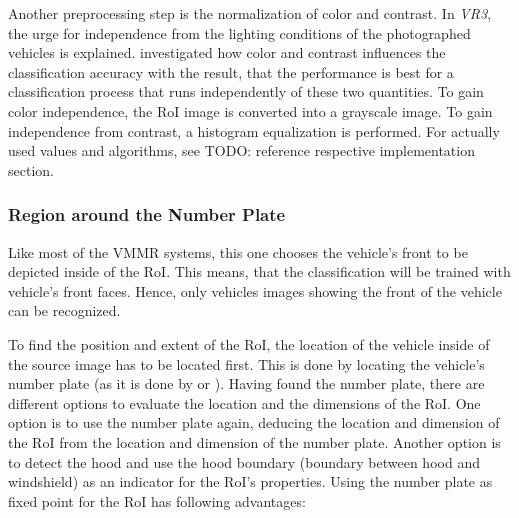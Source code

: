 Another preprocessing step is the normalization of color and contrast. In \emph{VR3}, the urge for independence from the lighting conditions of the photographed vehicles is explained. \citeauthor{petrovic2004analysis} investigated how color and contrast influences the classification accuracy with the result, that the performance is best for a classification process that runs independently of these two quantities. To gain color independence, the RoI image is converted into a grayscale image. To gain independence from contrast, a histogram equalization is performed. For actually used values and algorithms, see TODO: reference respective implementation section.

\subsubsection{Region around the Number Plate}\label{sec:regionAroundNumberPlate}
Like most of the VMMR systems, this one chooses the vehicle's front to be depicted inside of the RoI. This means, that the classification will be trained with vehicle's front faces. Hence, only vehicles images showing the front of the vehicle can be recognized.

To find the position and extent of the RoI, the location of the vehicle inside of the source image has to be located first. This is done by locating the vehicle's number plate (as it is done by \citep{petrovic2004analysis} or \citep{siddiqui2015robust}). Having found the number plate, there are different options to evaluate the location and the dimensions of the RoI. One option is to use the number plate again, deducing the location and dimension of the RoI from the location and dimension of the number plate. Another option is to detect the hood and use the hood boundary (boundary between hood and windshield) as an indicator for the RoI's properties. Using the number plate as fixed point for the RoI has following advantages:

